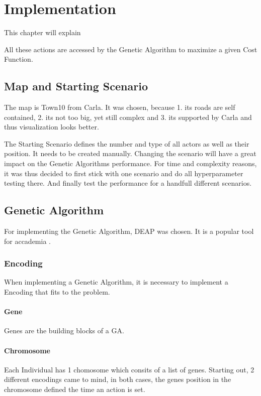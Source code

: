 \chapter{Implementation}
This chapter will explain 


All these actions are accessed by the Genetic Algorithm to maximize a given Cost Function.

\section{Map and Starting Scenario}
The map is Town10 from Carla. It was chosen, because 1. its roads are self contained, 2. its not too big, yet still complex and 3. its supported by Carla and thus visualization looks better.

The Starting Scenario defines the number and type of all actors as well as their position. It needs to be created manually.
Changing the scenario will have a great impact on the Genetic Algorithms performance. For time and complexity reasons, it was thus decided to first stick with one scenario and do all hyperparameter testing there. And finally test the performance for a handfull different scenarios.

\section{Genetic Algorithm}
For implementing the Genetic Algorithm, DEAP was chosen. It is a popular tool for accademia .

\subsection{Encoding}
When implementing a Genetic Algorithm, it is necessary to implement a Encoding that fits to the problem.

\subsubsection{Gene}
Genes are the building blocks of a GA.

\subsubsection{Chromosome}
Each Individual has 1 chomosome which consits of a list of genes. Starting out, 2 different encodings came to mind, in both cases, the genes position in the chromosome defined the time an action is set.

